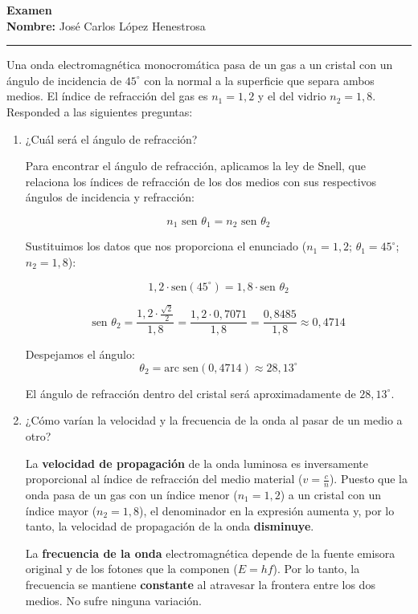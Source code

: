 \documentclass[11pt, a4paper]{article}
\newenvironment{problem}[1][Cuestión]{
	\vspace{0.5cm}
	\noindent{\Large\bfseries #1} \par\vspace{0.5cm}
}{
	\vspace{0.5cm}
}
\begin{document}
	\begin{center}
		\Large{ \textbf{Examen} } \\
		\vspace{0.5cm}
		\normalsize{\textbf{Nombre:} José Carlos López Henestrosa} \\
	\end{center}

	\vspace{1cm}
	\hrule
	\vspace{1cm}

	\begin{problem}[Cuestión 1]
		Una onda electromagnética monocromática pasa de un gas a un cristal con un ángulo de incidencia de $45^{\circ}$ con la normal a la superficie que separa ambos medios. El índice de refracción del gas es $n_1 = 1,2$ y el del vidrio $n_2 = 1,8$. Responded a las siguientes preguntas:

		\begin{enumerate}[label=\alph*)] 
			\item ¿Cuál será el ángulo de refracción?

				{ \color{blue} 
					Para encontrar el ángulo de refracción, aplicamos la ley de Snell, que relaciona los índices de refracción de los dos medios con sus respectivos ángulos de incidencia y refracción:

					$$n_1 \text{ sen } \theta_1 = n_2 \text{ sen } \theta_2$$

					Sustituimos los datos que nos proporciona el enunciado ($n_1 = 1,2$; $\theta_1 = 45^{\circ}$; $n_2 = 1,8$):

					$$1,2 \cdot \text{sen}(45^{\circ}) = 1,8 \cdot \text{sen } \theta_2$$

					$$\text{sen } \theta_2 = \frac{1,2 \cdot \frac{\sqrt{2}}{2}}{1,8} = \frac{1,2 \cdot 0,7071}{1,8} = \frac{0,8485}{1,8} \approx 0,4714$$

					Despejamos el ángulo:
					$$\theta_2 = \text{arc sen}(0,4714) \approx 28,13^{\circ}$$

					El ángulo de refracción dentro del cristal será aproximadamente de \textbf{$28,13^{\circ}$}.
				}

			\item ¿Cómo varían la velocidad y la frecuencia de la onda al pasar de un medio a otro?

				{ \color{blue} 
					La \textbf{velocidad de propagación} de la onda luminosa es inversamente proporcional al índice de refracción del medio material ($v = \frac{c}{n}$). Puesto que la onda pasa de un gas con un índice menor ($n_1 = 1,2$) a un cristal con un índice mayor ($n_2 = 1,8$), el denominador en la expresión aumenta y, por lo tanto, la velocidad de propagación de la onda \textbf{disminuye}.

					La \textbf{frecuencia de la onda} electromagnética depende de la fuente emisora original y de los fotones que la componen ($E = hf$). Por lo tanto, la frecuencia se mantiene \textbf{constante} al atravesar la frontera entre los dos medios. No sufre ninguna variación.
				}
		\end{enumerate}
	\end{problem}
\end{document}
